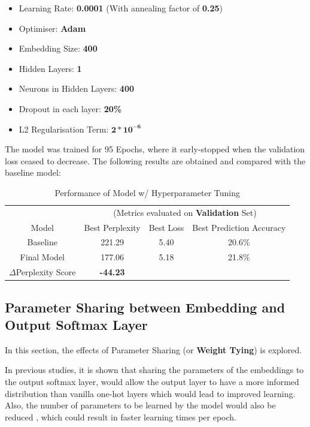\documentclass[sigconf,nonacm=true]{acmart}
\begin{document}
\begin{itemize}
	\item Learning Rate: \textbf{0.0001} (With annealing factor of \textbf{0.25})
	\item Optimiser: \textbf{Adam}
	\item Embedding Size: \textbf{400}
	\item Hidden Layers: \textbf{1}
	\item Neurons in Hidden Layers: \textbf{400}
	\item Dropout in each layer: \textbf{20\%}
	\item L2 Regularisation Term: \(\mathbf{2 * 10^{-6}}\)

\end{itemize}

The model was trained for 95 Epochs, where it early-stopped when the validation loss ceased to decrease. The following results are obtained and compared with the baseline model:

\begin{table}[H]
	\label{tab:regbasecomp}
	\begin{adjustbox}{width=\columnwidth}
		\begin{tabular}{cccc}
			\toprule
			&\multicolumn{3}{c}{(Metrics evaluated on \textbf{Validation} Set)}\\
			Model &Best Perplexity&Best Loss&Best Prediction Accuracy\\
			\midrule
			Baseline & 221.29 & 5.40 & 20.6\% \\
			Final Model & 177.06 & 5.18 & 21.8\% \\
			\midrule
			$\Delta$Perplexity Score & \textbf{-44.23}\\
			\bottomrule
		\end{tabular}
	\end{adjustbox}
	\caption{Performance of Model w/ Hyperparameter Tuning}
\end{table}

\subsection{Parameter Sharing between Embedding and Output Softmax Layer}
In this section, the effects of Parameter Sharing (or \textbf{Weight Tying}) is explored. 

In previous studies, it is shown that sharing the parameters of the embeddings to the output softmax layer, would allow the output layer to have a more informed distribution than vanilla one-hot layers which would lead to improved learning. Also, the number of parameters to be learned by the model would also be reduced \cite{inan2016tying}, which could result in faster learning times per epoch.
\end{document}
